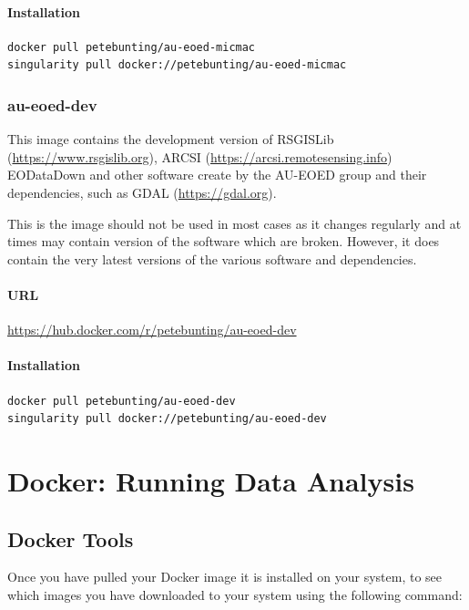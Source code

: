\documentclass[authoryear, 11pt, oneside]{report}
\begin{document}
\subsubsection{Installation}

\begin{verbatim}
docker pull petebunting/au-eoed-micmac
singularity pull docker://petebunting/au-eoed-micmac
\end{verbatim}


\subsection{au-eoed-dev}

This image contains the development version of RSGISLib (\url{https://www.rsgislib.org}), ARCSI (\url{https://arcsi.remotesensing.info}) EODataDown and other software create by the AU-EOED group and their dependencies, such as GDAL (\url{https://gdal.org}). 

This is the image should not be used in most cases as it changes regularly and at times may contain version of the software which are broken. However, it does contain the very latest versions of the various software and dependencies.

\subsubsection{URL}
\url{https://hub.docker.com/r/petebunting/au-eoed-dev}

\subsubsection{Installation}

\begin{verbatim}
docker pull petebunting/au-eoed-dev
singularity pull docker://petebunting/au-eoed-dev
\end{verbatim}


\chapter{Docker: Running Data Analysis}

\section{Docker Tools}
Once you have pulled your Docker image it is installed on your system, to see which images you have downloaded to your system using the following command: 
\end{document}
